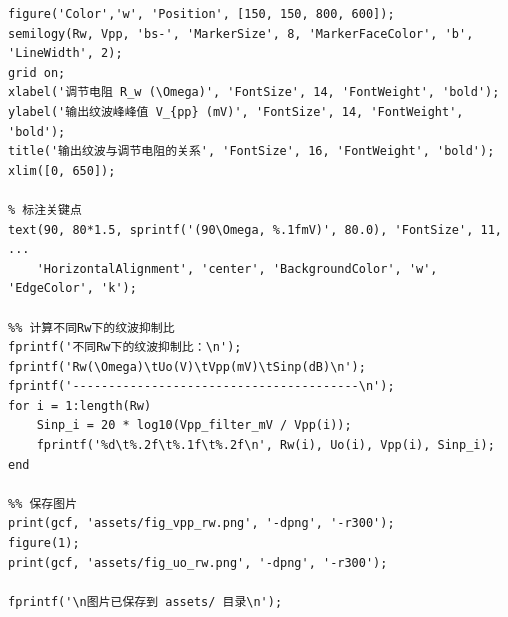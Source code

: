﻿\documentclass[12pt,a4paper]{article}
\begin{document}
\begin{lstlisting}[style=Matlab-boxed,caption={直流稳压电源数据处理代码}]
%% 绘图2：输出纹波与Rw的关系
figure('Color','w', 'Position', [150, 150, 800, 600]);
semilogy(Rw, Vpp, 'bs-', 'MarkerSize', 8, 'MarkerFaceColor', 'b', 'LineWidth', 2);
grid on;
xlabel('调节电阻 R_w (\Omega)', 'FontSize', 14, 'FontWeight', 'bold');
ylabel('输出纹波峰峰值 V_{pp} (mV)', 'FontSize', 14, 'FontWeight', 'bold');
title('输出纹波与调节电阻的关系', 'FontSize', 16, 'FontWeight', 'bold');
xlim([0, 650]);

% 标注关键点
text(90, 80*1.5, sprintf('(90\Omega, %.1fmV)', 80.0), 'FontSize', 11, ...
    'HorizontalAlignment', 'center', 'BackgroundColor', 'w', 'EdgeColor', 'k');

%% 计算不同Rw下的纹波抑制比
fprintf('不同Rw下的纹波抑制比：\n');
fprintf('Rw(\Omega)\tUo(V)\tVpp(mV)\tSinp(dB)\n');
fprintf('----------------------------------------\n');
for i = 1:length(Rw)
    Sinp_i = 20 * log10(Vpp_filter_mV / Vpp(i));
    fprintf('%d\t%.2f\t%.1f\t%.2f\n', Rw(i), Uo(i), Vpp(i), Sinp_i);
end

%% 保存图片
print(gcf, 'assets/fig_vpp_rw.png', '-dpng', '-r300');
figure(1);
print(gcf, 'assets/fig_uo_rw.png', '-dpng', '-r300');

fprintf('\n图片已保存到 assets/ 目录\n');
\end{lstlisting}
\end{document}
